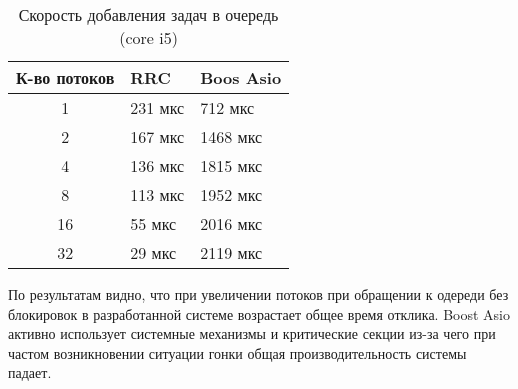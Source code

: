 \begin{table}[htb]
    \caption{\label{tab:core_asio}Скорость добавления задач в очередь (core i5)}
    \begin{center}
        \begin{tabularx}{\linewidth}{|c|X|X|}
            \hline
            К-во потоков & RRC & Boos Asio  \\
            \hline
            1 & 231 мкс & 712 мкс \\
            \hline
            2 & 167 мкс & 1468 мкс \\
            \hline
            4 & 136 мкс & 1815 мкс \\
            \hline
            8 & 113 мкс & 1952 мкс \\
            \hline
            16 & 55 мкс & 2016 мкс \\
            \hline
            32 & 29 мкс & 2119 мкс \\
            \hline
        \end{tabularx}
    \end{center}
\end{table}

По результатам видно, что при увеличении потоков при обращении к одереди без блокировок в разработанной системе возрастает общее время отклика. Boost Asio активно использует системные механизмы и критические секции из-за чего при частом возникновении ситуации гонки общая производительность системы падает.